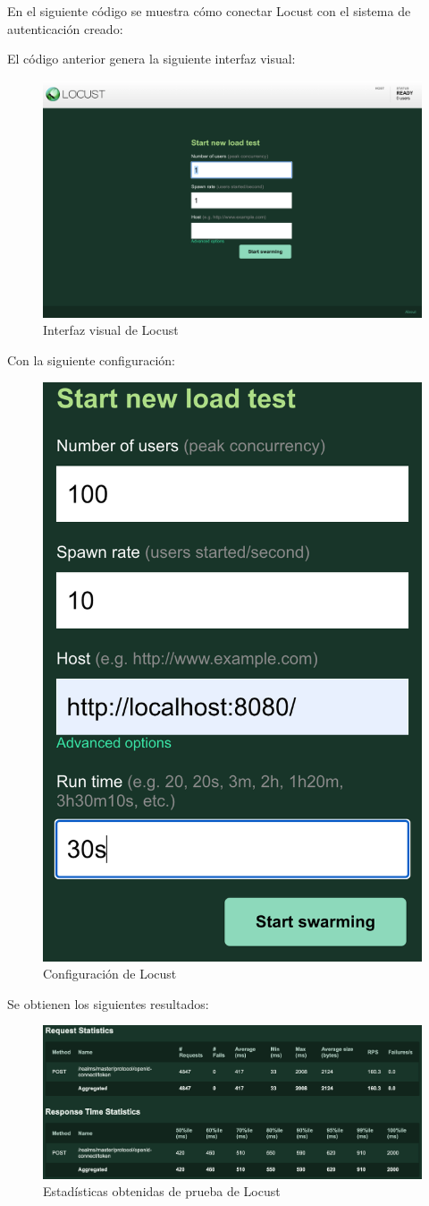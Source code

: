 En el siguiente código se muestra cómo conectar Locust con el sistema de autenticación creado:



El código anterior genera la siguiente interfaz visual:

\begin{figure}[H]
	\centering
	\includegraphics[width=0.9\linewidth]{Graphics/locust_visual}
	\caption{Interfaz visual de Locust}
	\label{fig:locustvisual}
\end{figure}

Con la siguiente configuración:

\begin{figure}[H]
	\centering
	\includegraphics[width=0.3\linewidth]{Graphics/locust_config}
	\caption{Configuración de Locust}
	\label{fig:locustconfig}
\end{figure}

Se obtienen los siguientes resultados:

\begin{figure}[H]
	\centering
	\includegraphics[width=0.9\linewidth]{Graphics/locust_statistics}
	\caption{Estadísticas obtenidas de prueba de Locust}
	\label{fig:locuststatistics}
\end{figure}

